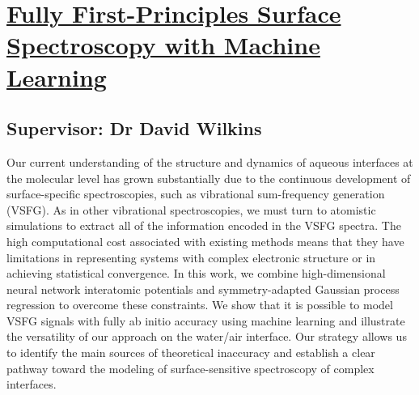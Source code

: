 \section{\href{https://doi.org/10.1021/acs.jpclett.3c01989}{Fully First-Principles Surface Spectroscopy with Machine Learning}}

\subsection*{Supervisor: Dr David Wilkins}



Our current understanding of the structure and dynamics of aqueous interfaces at the molecular level has grown substantially due to the continuous development of surface-specific spectroscopies, such as vibrational sum-frequency generation (VSFG). As in other vibrational spectroscopies, we must turn to atomistic simulations to extract all of the information encoded in the VSFG spectra. The high computational cost associated with existing methods means that they have limitations in representing systems with complex electronic structure or in achieving statistical convergence. In this work, we combine high-dimensional neural network interatomic potentials and symmetry-adapted Gaussian process regression to overcome these constraints. We show that it is possible to model VSFG signals with fully ab initio accuracy using machine learning and illustrate the versatility of our approach on the water/air interface. Our strategy allows us to identify the main sources of theoretical inaccuracy and establish a clear pathway toward the modeling of surface-sensitive spectroscopy of complex interfaces.
